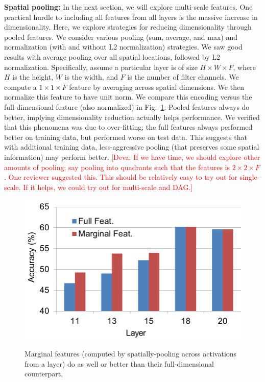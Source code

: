 \documentclass[10pt,twocolumn,letterpaper]{article}
\newcommand{\deva}[1]{\textcolor{red}{[Deva: #1]}}
\begin{document}
{\bf Spatial pooling:} In the next section, we will explore multi-scale features. One practical hurdle to including all features from all layers is the massive increase in dimensionality. Here, we explore strategies for reducing dimensionality through pooled features. We consider various pooling (sum, average, and max) and  normalization (with and without L2 normalization) strategies. We saw good results with average pooling over all spatial locations, followed by L2 normalization. Specifically, assume a particular layer is of size $H \times W \times F$, where $H$ is the height, $W$ is the width, and $F$ is the number of filter channels. We compute a $1 \times 1 \times F$ feature by averaging across spatial dimensions. We then normalize this feature to have unit norm. %
We compare this encoding versus the full-dimensional feature (also normalized) in Fig.~\ref{fig:full_marg}. Pooled features always do better, implying dimensionality reduction actually helps performance. We verified that this phenomena was due to over-fitting; the full features always performed better on training data, but performed worse on test data. This suggests that with additional training data, less-aggressive pooling (that preserves some spatial information) may perform better. \deva{If we have time, we should explore other amounts of pooling; say pooling into quadrants such that the features is $2 \times 2 \times F$. One reviewer suggested this. This should be relatively easy to try out for single-scale. If it helps, we could try out for multi-scale and DAG.}

\begin{figure}[t!]
\centering
	{\includegraphics[width=.6\columnwidth]{fig/full_marg.png}}
\caption{Marginal features (computed by spatially-pooling across activations from a layer) do as well or better than their full-dimensional counterpart. }
\label{fig:full_marg}
\end{figure}
\end{document}
